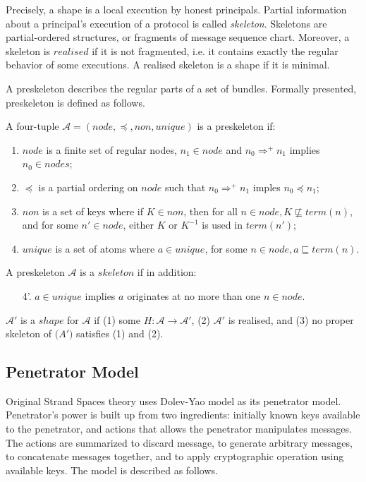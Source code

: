 Precisely, a shape is a local execution by honest principals. Partial information about a principal's execution of a protocol is called \emph{skeleton}. Skeletons are partial-ordered structures, or fragments of message sequence chart. Moreover, a skeleton is $realised$ if it is not fragmented, i.e. it contains exactly the regular behavior of some executions. A realised skeleton is a shape if it is minimal. 

A preskeleton describes the regular parts of a set of bundles. Formally presented, preskeleton is defined as follows.
\begin{Definition}[Skeleton]A four-tuple $\mathcal{A} = (node, \preceq, non, unique)$ is a preskeleton if:
	\begin{enumerate}
	\item $node$ is a finite set of regular nodes, $n_1 \in node$ and $n_0 \Rightarrow^+ n_1$ implies $n_0 \in nodes$;
	\item $\preceq$ is a partial ordering on $node$ such that $n_0 \Rightarrow^+ n_1$ imples $n_0 \preceq n_1$;
	\item $non$ is a set of keys where if $K \in non$, then for all $n \in node, K\not\sqsubseteq term(n)$, and for some $n' \in node$, either $K$ or $K^{-1}$ is used in $term(n')$;
	\item $unique$ is a set of atoms where $a \in unique$, for some $n \in node, a \sqsubseteq term(n)$. 
	\end{enumerate}
	A preskeleton $\mathcal{A}$ is a $skeleton$ if in addition:
	\begin{enumerate}
	\item[4'.] $a\in unique$ implies $a$ originates at no more than one $n\in node$. 
	\end{enumerate}
\end{Definition}

\begin{Definition}[Shape] $\mathcal{A}'$ is a $shape$ for $\mathcal{A}$ if (1) some $H : \mathcal{A} \rightarrow \mathcal{A'}$, (2) $\mathcal{A'}$ is realised, and (3) no proper skeleton of $\mathcal(A')$ satisfies (1) and (2). 
\end{Definition}

\subsection{Penetrator Model}

Original Strand Spaces theory uses Dolev-Yao \cite{dolev-yao} model as its penetrator model. Penetrator's power is built up from two ingredients: initially known keys available to the penetrator, and actions that allows the penetrator manipulates messages. The actions are summarized to discard message, to generate arbitrary messages, to concatenate messages together, and to apply cryptographic operation using available keys. The model is described as follows. 


